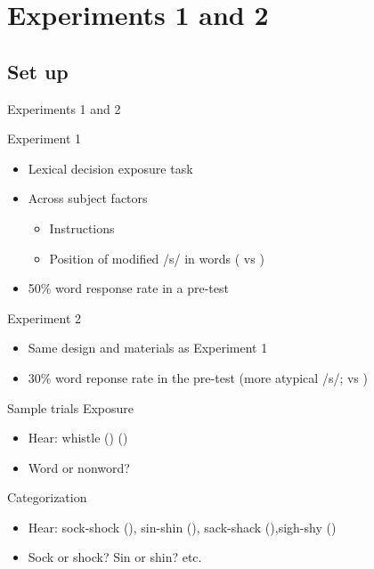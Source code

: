 \documentclass{beamer}
\begin{document}
\section{Experiments 1 and 2}

\subsection{Set up}

\begin{frame}{Experiments 1 and 2}

Experiment 1
\begin{itemize}
\item Lexical decision exposure task
\item Across subject factors
\begin{itemize}
\item Instructions
\item Position of modified /s/ in words ( vs )
\end{itemize}
\item 50\% word response rate in a pre-test
\end{itemize}
Experiment 2
\begin{itemize}
\item Same design and materials as Experiment 1
\item 30\% word reponse rate in the pre-test (more atypical /s/;  vs )
\end{itemize}

\end{frame}

\begin{frame}{Sample trials}
Exposure
\begin{itemize}
\item Hear: whistle () ()
\item Word or nonword?
\end{itemize}
Categorization
\begin{itemize}
\item Hear: sock-shock (), sin-shin (), sack-shack (),sigh-shy ()
\item Sock or shock? Sin or shin? etc.
\end{itemize}
\end{frame}
\end{document}
